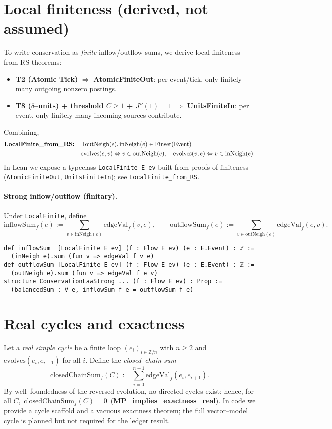 \documentclass[11pt]{article}
\begin{document}
\section{Local finiteness (derived, not assumed)}
To write conservation as \emph{finite} inflow/outflow sums, we derive local finiteness from RS theorems:
\begin{itemize}[leftmargin=*]
  \item \textbf{T2 (Atomic Tick)} $\Rightarrow$ \textbf{AtomicFiniteOut}: per event/tick, only finitely many outgoing nonzero postings.
  \item \textbf{T8 ($\delta$–units) + threshold $C\!\ge\!1$ + $J''(1){=}1$} $\Rightarrow$ \textbf{UnitsFiniteIn}: per event, only finitely many incoming sources contribute.
\end{itemize}
Combining,
\begin{align*}
  &\text{\bf LocalFinite\_from\_RS:} &&\exists\,\mathrm{outNeigh}(e),\mathrm{inNeigh}(e)\in\mathrm{Finset}(\mathrm{Event})\\
  &&&\mathrm{evolves}(e,v) \Leftrightarrow v\in\mathrm{outNeigh}(e),\quad \mathrm{evolves}(v,e) \Leftrightarrow v\in\mathrm{inNeigh}(e).
\end{align*}
In Lean we expose a typeclass \texttt{LocalFinite E ev} built from proofs of finiteness (\texttt{AtomicFiniteOut}, \texttt{UnitsFiniteIn}); see \texttt{LocalFinite\_from\_RS}.

\paragraph{Strong inflow/outflow (finitary).} Under \texttt{LocalFinite}, define
\[
  \mathrm{inflowSum}_f(e) := \sum\limits_{v\in \mathrm{inNeigh}(e)} \mathrm{edgeVal}_f(v,e),\qquad
  \mathrm{outflowSum}_f(e) := \sum\limits_{v\in \mathrm{outNeigh}(e)} \mathrm{edgeVal}_f(e,v).
\]
\begin{verbatim}
def inflowSum  [LocalFinite E ev] (f : Flow E ev) (e : E.Event) : ℤ :=
  (inNeigh e).sum (fun v => edgeVal f v e)
def outflowSum [LocalFinite E ev] (f : Flow E ev) (e : E.Event) : ℤ :=
  (outNeigh e).sum (fun v => edgeVal f e v)
structure ConservationLawStrong ... (f : Flow E ev) : Prop :=
  (balancedSum : ∀ e, inflowSum f e = outflowSum f e)
\end{verbatim}

\section{Real cycles and exactness}
Let a \emph{real simple cycle} be a finite loop $(e_i)_{i\in \mathbb{Z}/n}$ with $n\ge 2$ and $\mathrm{evolves}(e_i,e_{i+1})$ for all $i$. Define the \emph{closed–chain sum}
\[
  \mathrm{closedChainSum}_f(C) := \sum_{i=0}^{n-1} \mathrm{edgeVal}_f(e_i,e_{i+1}).
\]
By well–foundedness of the reversed evolution, no directed cycles exist; hence, for all $C$, \,$\mathrm{closedChainSum}_f(C)=0$ \,(\textbf{MP\_implies\_exactness\_real}). In code we provide a cycle scaffold and a vacuous exactness theorem; the full vector–model cycle is planned but not required for the ledger result.
\end{document}
